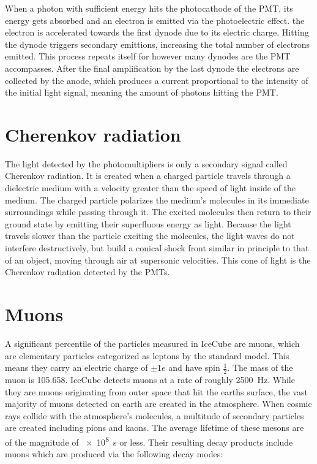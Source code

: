 When a photon with sufficient energy hits the photocathode of the PMT, its energy gets absorbed and an electron is emitted via the photoelectric effect.
the electron is accelerated towards the first dynode due to its electric charge. Hitting the dynode triggers secondary emittions, increasing the total 
number of electrons emitted. This process repeats itself for however many dynodes are the PMT accompasses. After the final amplification by the last 
dynode the electrons are collected by the anode, which produces a current proportional to the intensity of the initial light signal, meaning the amount of
photons hitting the PMT\@. 

\section{Cherenkov radiation}

The light detected by the photomultipliers is only a secondary signal called Cherenkov radiation. It is created when a charged particle travels through a 
dielectric medium with a velocity greater than the speed of light inside of the medium. The charged particle polarizes the medium's molecules in its
immediate surroundings while passing through it. The excited molecules then return to their ground state by emitting their superfluous energy as light.
Because the light travels slower than the particle exciting the molecules, the light waves do not interfere destructively, but build a conical shock front 
similar in principle to that of an object, moving through air at supersonic velocities. This cone of light is the Cherenkov radiation detected by the PMTs.

\section{Muons}

A significant percentile of the particles measured in IceCube are muons, which are elementary particles categorized as leptons by the standard model.
This means they carry an electric charge of $\pm 1e$ and have spin $\frac{1}{2}$. The mass of the muon is \num{105.658}. IceCube detects
muons at a rate of roughly \SI{2500}{Hz}. While they are muons originating from outer space that hit the earths surface, the vast majority of muons detected
on earth are created in the atmosphere. When cosmic rays collide with the atmosphere's molecules, a multitude of secondary particles are created including 
pions and kaons. The average lifetime of these mesons are of the magnitude of \SI{e8}{s} or less. Their resulting decay products include muons which are 
produced via the following decay modes:\\

